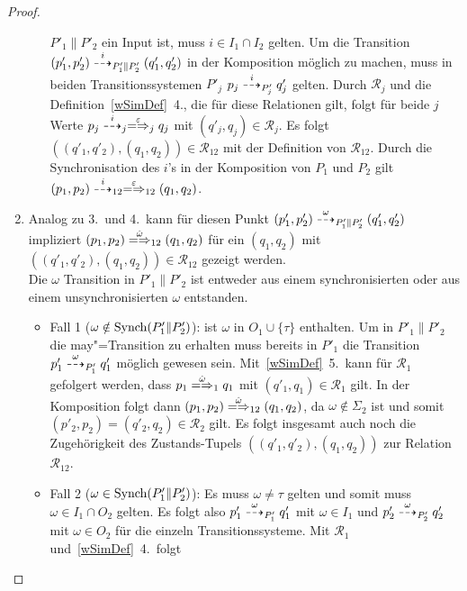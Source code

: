 \begin{proof}
\begin{enumerate}
\begin{itemize}
          $P'_1\|P'_2$ ein Input ist, muss $i\in I_1\cap I_2$ gelten. Um die
          Transition $(p'_1,p'_2)\may[i]_{P'_1\|P'_2}(q'_1,q'_2)$ in der
          Komposition möglich zu machen, muss in beiden Transitionssystemen
          $P'_j$ $p_j \may[i]_{P'_j} q'_j$ gelten. Durch $\mathcal{R}_j$ und
          die Definition~\ref{wSimDef}~4., die für diese Relationen gilt, folgt
          für beide $j$ Werte $p_j\may[i]_j \weakmay[\varepsilon]_j q_j$ mit
          $(q'_j,q_j)\in\mathcal{R}_j$. Es folgt $((q'_1,q'_2),(q_1,q_2)) \in
          \mathcal{R}_{12}$ mit der Definition von $\mathcal{R}_{12}$. Durch
          die Synchronisation des $i$'s in der Komposition von $P_1$ und $P_2$
          gilt $(p_1,p_2) \may[i]_{12} \weakmay[\varepsilon]_{12} (q_1,q_2)$.
      \end{itemize}
    \item Analog zu 3.\ und 4.\ kann für diesen Punkt $(p'_1,p'_2)
      \may[\omega]_{P'_1\|P'_2} (q'_1,q'_2)$ impliziert $(p_1,p_2)
      \weakmay[\hat{\omega}]_{12} (q_1,q_2)$ für ein $(q_1,q_2)$ mit
      $((q'_1,q'_2),(q_1,q_2))\in\mathcal{R}_{12}$ gezeigt werden.\\
      Die $\omega$ Transition in $P'_1\|P'_2$ ist entweder aus einem
      synchronisierten oder aus einem unsynchronisierten $\omega$ entstanden.
      \begin{itemize}
        \item Fall 1 ($\omega\notin\mathrm{Synch} (P'_1\|P'_2)$): \OBdA{} ist $\omega$
          in $O_1\cup\{\tau\}$ enthalten. Um in $P'_1\|P'_2$ die
          may"=Transition zu erhalten muss bereits in $P'_1$ die Transition
          $p'_1 \may[\omega]_{P'_1} q'_1$ möglich gewesen sein.
          Mit~\ref{wSimDef}~5.\ kann für $\mathcal{R}_1$ gefolgert werden, dass
          $p_1 \weakmay[\hat{\omega}]_1 q_1$ mit $(q'_1,q_1)\in\mathcal{R}_1$
          gilt. In der Komposition folgt dann $(p_1,p_2)
          \weakmay[\hat{\omega}]_{12} (q_1,q_2)$, da $\omega\notin \Sigma _2$
          ist und somit $(p'_2,p_2)=(q'_2,q_2)\in\mathcal{R}_2$ gilt. Es folgt
          insgesamt auch noch die Zugehörigkeit des Zustands-Tupels
          $((q'_1,q'_2),(q_1,q_2))$ zur Relation $\mathcal{R}_{12}$.
        \item Fall 2 ($\omega\in\mathrm{Synch} (P'_1\|P'_2)$): Es muss $\omega\neq\tau$
          gelten und somit muss \oBdA{} $\omega\in I_1\cap O_2$ gelten. Es
          folgt also $p'_1\may[\omega]_{P'_1} q'_1$ mit $\omega\in I_1$ und
          $p'_2\may[\omega]_{P'_2} q'_2$ mit $\omega\in O_2$ für die einzeln
          Transitionssysteme. Mit $\mathcal{R}_1$ und~\ref{wSimDef}~4.\ folgt

\end{itemize}
\end{enumerate}
\end{proof}
